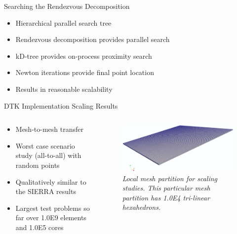 \documentclass{beamer}
\begin{document}
\begin{frame}{Searching the Rendezvous Decomposition}
  
  \begin{itemize}
  \item Hierarchical parallel search tree
    \medskip
  \item Rendezvous decomposition provides parallel search
    \medskip
  \item kD-tree provides on-process proximity search
    \medskip
  \item Newton iterations provide final point location
    \medskip
  \item Results in reasonable scalability
  \end{itemize}

\end{frame}

\begin{frame}{DTK Implementation Scaling Results}

  \begin{columns}
    
    \begin{column}{0.5\textwidth}
      \begin{itemize}
      \item Mesh-to-mesh transfer
      \item Worst case scenario study (all-to-all) with random points
        \medskip
      \item Qualitatively similar to the SIERRA results
        \medskip
      \item Largest test problems so far over 1.0E9 elements and 1.0E5
        cores
      \end{itemize}
    \end{column}

    \begin{column}{0.5\textwidth}
      \begin{figure}
      \centering
      \includegraphics[width=2.4in]{mesh.png}
      \caption{\sl Local mesh partition for scaling studies. This
        particular mesh partition has 1.0E4 tri-linear hexahedrons.}
      \end{figure}
    \end{column}

  \end{columns}

\end{frame}
\end{document}
